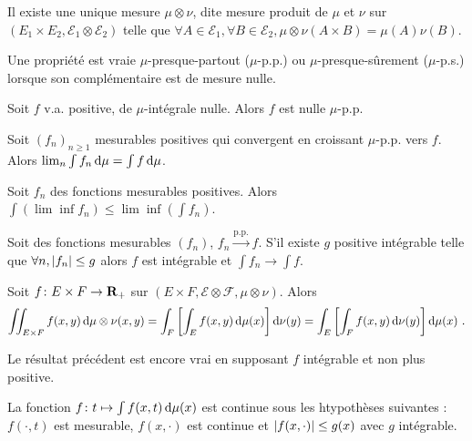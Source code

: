 \begin{thm}
	Il existe une unique mesure $\mu \otimes \nu$, dite mesure produit de $\mu$ et $\nu$ sur $(E_1 \times E_2, \mathcal{E}_1 \otimes \mathcal{E}_2)$ telle que $\forall A \in \mathcal{E}_1, \forall B \in \mathcal{E}_2, \mu \otimes \nu(A \times B) = \mu(A) \nu(B)$.
\end{thm}

\begin{note}
	Une propriété est vraie $\mu$-presque-partout ($\mu$-p.p.) ou $\mu$-presque-sûrement ($\mu$-p.s.) lorsque son complémentaire est de mesure nulle.
\end{note}

\begin{thm}
	Soit $f$ v.a. positive, de $\mu$-intégrale nulle.
	Alors $f$ est nulle $\mu$-p.p.
\end{thm}

\begin{thm}
	Soit $(f_n)_{n \geq 1}$ mesurables positives qui convergent en croissant $\mu$-p.p. vers $f$.
	Alors $\lim_n \int f_n \mathop{}\mathopen{}\mathrm{d} \mu = \int f \mathop{}\mathopen{}\mathrm{d} \mu$.
\end{thm}

\begin{lem}
	Soit $f_n$ des fonctions mesurables positives.
	Alors $\int (\lim \inf f_n) \leq \lim \inf (\int f_n)$.
\end{lem}

\begin{thm}
	Soit des fonctions mesurables $(f_n)$, $f_n \overset{\text{p.p.}}{\to} f$.
	S'il existe $g$ positive intégrable telle que $\forall n, \left\lvert f_n\right\rvert \leq g$ alors $f$ est intégrable et $\int f_n \to \int f$.
\end{thm}

\begin{thm}
	Soit $f \colon E \times F \to \mathbf{R}_+$ sur $(E \times F, \mathcal{E} \otimes \mathcal{F}, \mu \otimes \nu)$.
	Alors
	$$\iint_{E \times F} f(x,y) \mathop{}\mathopen{}\mathrm{d} \mu \otimes \nu(x,y) = \int_F \left[ \int_E f(x,y) \mathop{}\mathopen{}\mathrm{d} \mu(x) \right] \mathop{}\mathopen{}\mathrm{d} \nu(y) = \int_E \left[ \int_F f(x,y) \mathop{}\mathopen{}\mathrm{d} \nu(y) \right] \mathop{}\mathopen{}\mathrm{d} \mu(x)\ .$$
\end{thm}

\begin{thm}[Fubini]
	Le résultat précédent est encore vrai en supposant $f$ intégrable et non plus positive.
\end{thm}

\begin{thm}
	La fonction $f \colon t \mapsto \int f(x,t) \mathop{}\mathopen{}\mathrm{d} \mu(x)$ est continue sous les htypothèses suivantes : $f(\cdot,t)$ est mesurable, $f(x,\cdot)$ est continue et $\left\lvert f(x,\cdot)\right\rvert \leq g(x)$ avec $g$ intégrable.
\end{thm}

